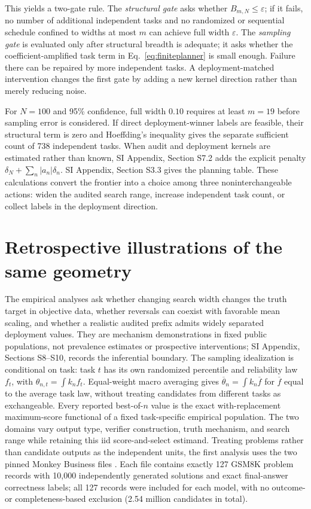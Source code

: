 \documentclass[10pt,twocolumn]{article}
\begin{document}
This yields a two-gate rule. The \emph{structural gate} asks whether $B_{m,N}\le\varepsilon$; if it fails, no number of additional independent tasks and no randomized or sequential schedule confined to widths at most $m$ can achieve full width $\varepsilon$. The \emph{sampling gate} is evaluated only after structural breadth is adequate; it asks whether the coefficient-amplified task term in Eq.~\ref{eq:finiteplanner} is small enough. Failure there can be repaired by more independent tasks. A deployment-matched intervention changes the first gate by adding a new kernel direction rather than merely reducing noise.

For $N=100$ and 95\% confidence, full width $0.10$ requires at least $m=19$ before sampling error is considered. If direct deployment-winner labels are feasible, their structural term is zero and Hoeffding's inequality gives the separate sufficient count of 738 independent tasks. When audit and deployment kernels are estimated rather than known, SI Appendix, Section S7.2 adds the explicit penalty $\delta_N+\sum_n|a_n|\delta_n$. SI Appendix, Section S3.3 gives the planning table. These calculations convert the frontier into a choice among three noninterchangeable actions: widen the audited search range, increase independent task count, or collect labels in the deployment direction.

\section*{Retrospective illustrations of the same geometry}

The empirical analyses ask whether changing search width changes the truth target in objective data, whether reversals can coexist with favorable mean scaling, and whether a realistic audited prefix admits widely separated deployment values. They are mechanism demonstrations in fixed public populations, not prevalence estimates or prospective interventions; SI Appendix, Sections S8--S10, records the inferential boundary. The sampling idealization is conditional on task: task $t$ has its own randomized percentile and reliability law $f_t$, with $\theta_{n,t}=\int k_n f_t$. Equal-weight macro averaging gives $\overline\theta_n=\int k_n\overline f$ for $\overline f$ equal to the average task law, without treating candidates from different tasks as exchangeable. Every reported best-of-$n$ value is the exact with-replacement maximum-score functional of a fixed task-specific empirical population. The two domains vary output type, verifier construction, truth mechanism, and search range while retaining this iid score-and-select estimand. Treating problems rather than candidate outputs as the independent units, the first analysis uses the two pinned Monkey Business files \citep{brown2024}. Each file contains exactly 127 GSM8K problem records with 10,000 independently generated solutions and exact final-answer correctness labels; all 127 records were included for each model, with no outcome- or completeness-based exclusion (2.54 million candidates in total).
\end{document}
